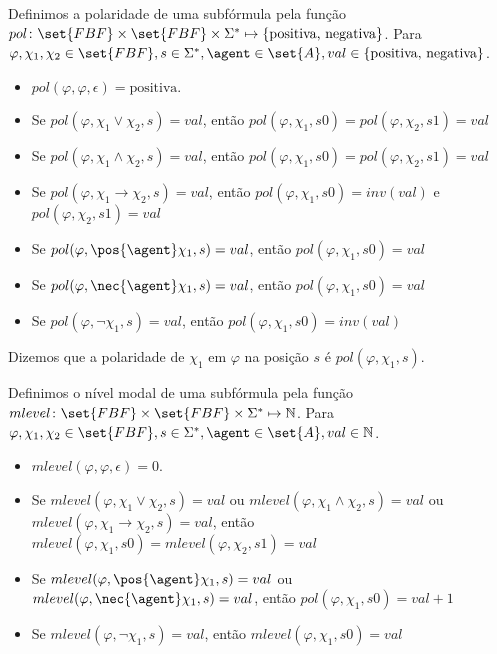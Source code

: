\begin{definition}
	Definimos a polaridade de uma subfórmula pela função $pol \colon \set{FBF} \times \set{FBF} \times \Sigma^* \mapsto \{\text{positiva, negativa}\}$.  Para $\varphi, \chi_1, \chi_2 \in \set{FBF}, s \in \Sigma^*, \agent \in \set{A}, val \in \{\text{positiva, negativa}\}$.
	
	\begin{itemize}
		\item $pol(\varphi, \varphi, \epsilon) = \text{positiva}$.
		\item Se $pol(\varphi, \chi_1 \lor \chi_2, s) = val$, então $pol(\varphi, \chi_1, s0) = pol(\varphi, \chi_2, s1) = val$
		\item Se $pol(\varphi, \chi_1 \land \chi_2, s) = val$, então $pol(\varphi, \chi_1, s0) = pol(\varphi, \chi_2, s1) = val$
		\item Se $pol(\varphi, \chi_1 \rightarrow \chi_2, s) = val$, então $pol(\varphi, \chi_1, s0) = inv(val)$ e $pol(\varphi, \chi_2, s1) = val$
		\item Se $pol(\varphi, \pos{\agent}\chi_1, s) = val$, então $pol(\varphi, \chi_1, s0) = val$
		\item Se $pol(\varphi, \nec{\agent}\chi_1, s) = val$, então $pol(\varphi, \chi_1, s0) = val$
		\item Se $pol(\varphi, \neg\chi_1, s) = val$, então $pol(\varphi, \chi_1, s0) = inv(val)$
	\end{itemize}
	
\end{definition}
Dizemos que a polaridade de $\chi_1$ em $\varphi$ na posição $s$ é $pol(\varphi, \chi_1, s)$.

\begin{definition}
	Definimos o nível modal de uma subfórmula pela função $mlevel \colon \set{FBF} \times \set{FBF} \times \Sigma^* \mapsto \mathbb{N}$. Para $\varphi, \chi_1, \chi_2 \in \set{FBF}, s \in \Sigma^*, \agent \in \set{A}, val \in \mathbb{N}$.
	
	\begin{itemize}
		\item $mlevel(\varphi, \varphi, \epsilon) = 0$.
		\item Se $mlevel(\varphi, \chi_1 \lor \chi_2, s) = val$ ou $mlevel(\varphi, \chi_1 \land \chi_2, s) = val$ ou $mlevel(\varphi, \chi_1 \rightarrow \chi_2, s) = val$, então $mlevel(\varphi, \chi_1, s0) = mlevel(\varphi, \chi_2, s1) = val$
		\item Se $mlevel(\varphi, \pos{\agent}\chi_1, s) = val$ ou $mlevel(\varphi, \nec{\agent}\chi_1, s) = val$, então $pol(\varphi, \chi_1, s0) = val+1$
		\item Se $mlevel(\varphi, \neg\chi_1, s) = val$, então $mlevel(\varphi, \chi_1, s0) = val$
	\end{itemize}
\end{definition}


